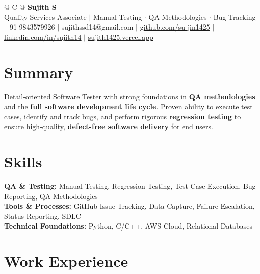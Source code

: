 \documentclass[a4paper,10pt]{article}
\newcommand{\ulink}[2]{\href{#1}{\uline{#2}}}
\begin{document}
\pagestyle{empty}

\begin{tabularx}{\linewidth}{@{} C @{}}
{\color[HTML]{000000}\fontsize{30}{35}\selectfont\bfseries Sujith S} \\[5pt]
{\fontsize{10.5}{12.5}\selectfont\color[HTML]{3A3A3A}
Quality Services Associate $|$ Manual Testing $\cdot$ QA Methodologies $\cdot$ Bug Tracking} \\[6pt]
{\fontsize{9.5}{11.5}\selectfont\textcolor[HTML]{3A3A3A}{+91 9843579926 $|$ sujithssd14@gmail.com $|$ \ulink{https://github.com/su-jin1425}{github.com/su-jin1425} $|$ \ulink{https://linkedin.com/in/sujith14}{linkedin.com/in/sujith14} $|$ \ulink{https://sujith1425.vercel.app}{sujith1425.vercel.app}}}
\end{tabularx}

\vspace{2pt}

\section{Summary}
\vspace{3pt}
{\color[HTML]{0A0A0A}\fontsize{11}{14}\selectfont
Detail-oriented Software Tester with strong foundations in \textbf{QA methodologies} and the \textbf{full software development life cycle}. Proven ability to execute test cases, identify and track bugs, and perform rigorous \textbf{regression testing} to ensure high-quality, \textbf{defect-free software delivery} for end users.}

\vspace{2pt}

\section{Skills}
\vspace{3pt}
{\color[HTML]{0A0A0A}\fontsize{11}{14}\selectfont
\textbf{QA \& Testing:} Manual Testing, Regression Testing, Test Case Execution, Bug Reporting, QA Methodologies \\[2pt]
\textbf{Tools \& Processes:} GitHub Issue Tracking, Data Capture, Failure Escalation, Status Reporting, SDLC \\[2pt]
\textbf{Technical Foundations:} Python, C/C++, AWS Cloud, Relational Databases}

\vspace{2pt}

\section{Work Experience}
\vspace{2pt}
\end{document}
